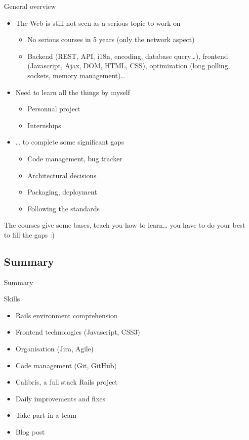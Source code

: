 \documentclass[10pt,a4paper]{beamer}
\begin{document}
\begin{frame}{General overview}
	\begin{itemize}
	  \item The Web is still not seen as a serious topic to work on 
      \begin{itemize}
        \item No serious courses in 5 years (only the network aspect)
        \item Backend (REST, API, i18n, encoding, database query…), frontend (Javascript, Ajax, DOM, HTML, CSS), optimization (long polling, sockets, memory management)…
      \end{itemize}

	  \item Need to learn all the things by myself
      \begin{itemize}
        \item Personnal project 
        \item Internships
      \end{itemize}
      
      \item … to complete some significant gaps
      \begin{itemize}
        \item Code management, bug tracker
        \item Architectural decisions 
        \item Packaging, deployment
        \item Following the standards
      \end{itemize}
	\end{itemize}
	
	The courses give some bases, teach you how to learn… you have to do your best to fill the gaps :)
\end{frame}

\subsection{Summary}

\begin{frame}{Summary}
    \begin{block}{Skills}
    \begin{itemize}
      \item Rails environment comprehension
      \item Frontend technologies (Javascript, CSS3)
      \item Organisation (Jira, Agile)
      \item Code management (Git, GitHub)
    \end{itemize}
  \end{block}
  
  \begin{itemize}
    \item Calibris, a full stack Rails project 
    \item Daily improvements and fixes
    \item Take part in a team
    \item Blog post
  \end{itemize}
\end{frame}
\end{document}
